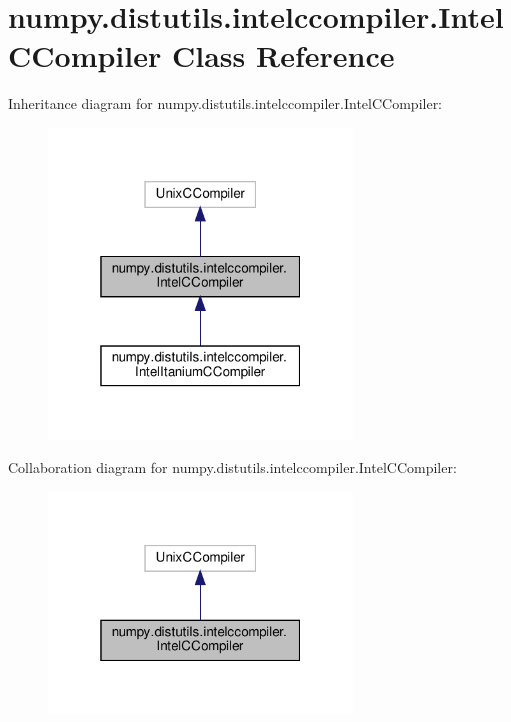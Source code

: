 \hypertarget{classnumpy_1_1distutils_1_1intelccompiler_1_1IntelCCompiler}{}\section{numpy.\+distutils.\+intelccompiler.\+Intel\+C\+Compiler Class Reference}
\label{classnumpy_1_1distutils_1_1intelccompiler_1_1IntelCCompiler}


Inheritance diagram for numpy.\+distutils.\+intelccompiler.\+Intel\+C\+Compiler\+:
\nopagebreak
\begin{figure}[H]
\begin{center}
\leavevmode
\includegraphics[width=229pt]{classnumpy_1_1distutils_1_1intelccompiler_1_1IntelCCompiler__inherit__graph}
\end{center}
\end{figure}


Collaboration diagram for numpy.\+distutils.\+intelccompiler.\+Intel\+C\+Compiler\+:
\nopagebreak
\begin{figure}[H]
\begin{center}
\leavevmode
\includegraphics[width=229pt]{classnumpy_1_1distutils_1_1intelccompiler_1_1IntelCCompiler__coll__graph}
\end{center}
\end{figure}
